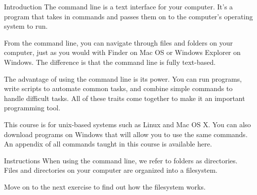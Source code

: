Introduction
    The command line is a text interface for your computer. It’s a program that takes in commands and passes them on to the computer’s operating system to run.

    From the command line, you can navigate through files and folders on your computer, just as you would with Finder on Mac OS or Windows Explorer on Windows. The difference is that the command line is fully text-based.

    The advantage of using the command line is its power. You can run programs, write scripts to automate common tasks, and combine simple commands to handle difficult tasks. All of these traits come together to make it an important programming tool.

    This course is for unix-based systems such as Linux and Mac OS X. You can also download programs on Windows that will allow you to use the same commands. An appendix of all commands taught in this course is available here.

Instructions
    When using the command line, we refer to folders as directories. Files and directories on your computer are organized into a filesystem.

    Move on to the next exercise to find out how the filesystem works.